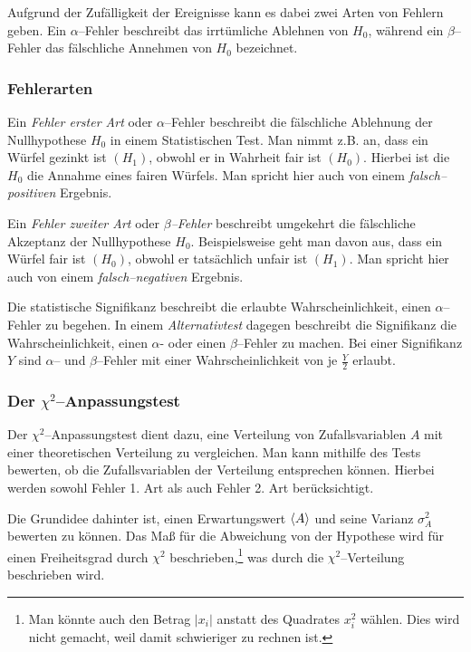 \documentclass[12pt,a4paper]{scrartcl}
\numberwithin{equation}{section} %
\begin{document}
Aufgrund der Zufälligkeit der Ereignisse kann es dabei zwei Arten von Fehlern geben. Ein $\alpha$--Fehler beschreibt das irrtümliche Ablehnen von $H_0$, während ein $\beta$--Fehler das fälschliche Annehmen von $H_0$ bezeichnet.

\hypertarget{fehlerarten}{%
\subsubsection{Fehlerarten}\label{fehlerarten}}
Ein \emph{Fehler erster Art} oder $\alpha$--Fehler beschreibt die fälschliche Ablehnung der Nullhypothese $H_0$ in einem Statistischen Test. Man nimmt z.B. an, dass ein Würfel gezinkt ist $(H_1)$, obwohl er in Wahrheit fair ist $(H_0)$. Hierbei ist die $H_0$ die Annahme eines fairen Würfels. Man spricht hier auch von einem \emph{falsch--positiven} Ergebnis. \cite{Statistical Inference}

Ein \emph{Fehler zweiter Art} oder \emph{$\beta$--Fehler} beschreibt umgekehrt die fälschliche Akzeptanz der Nullhypothese $H_0$. Beispielsweise geht man davon aus, dass ein Würfel fair ist $(H_0)$, obwohl er tatsächlich unfair ist $(H_1)$. Man spricht hier auch von einem \emph{falsch--negativen} Ergebnis. \cite{Statistical Inference}

Die statistische Signifikanz beschreibt die erlaubte Wahrscheinlichkeit, einen $\alpha$--Fehler zu begehen. \cite{Statistical Inference} In einem \emph{Alternativtest} dagegen beschreibt die Signifikanz die Wahrscheinlichkeit, einen $\alpha$- oder einen $\beta$--Fehler zu machen. Bei einer Signifikanz $Y$ sind $\alpha$-- und $\beta$--Fehler mit einer Wahrscheinlichkeit von je $\frac{Y}{2}$ erlaubt.

\hypertarget{der-chi2anpassungstest}{%
\subsubsection{\texorpdfstring{Der
$\chi^2$--Anpassungstest}{Der \textbackslash chi\^{}2--Anpassungstest}}\label{der-chi2anpassungstest}}

Der $\chi^2$--Anpassungstest dient dazu, eine Verteilung von Zufallsvariablen $A$ mit einer theoretischen Verteilung zu vergleichen. Man kann mithilfe des Tests bewerten, ob die Zufallsvariablen der Verteilung entsprechen können. Hierbei werden sowohl Fehler 1. Art als auch Fehler 2. Art berücksichtigt.

Die Grundidee dahinter ist, einen Erwartungswert $\expval{A}$ und seine Varianz $\sigma_A^2$ bewerten zu können. Das Maß für die Abweichung von der Hypothese wird für einen Freiheitsgrad durch $\chi^2$ beschrieben,\footnote{Man könnte auch den Betrag $|x_i|$   anstatt des Quadrates $x_i^2$ wählen. Dies wird nicht gemacht, weil   damit schwieriger zu rechnen ist.} was durch die $\chi^2$--Verteilung beschrieben wird.
\end{document}
